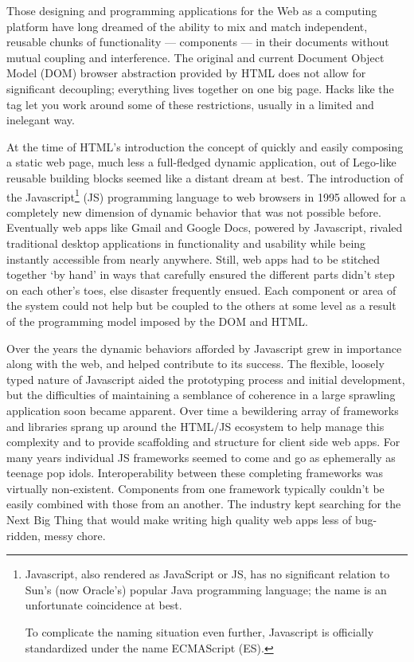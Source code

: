 Those designing and programming applications for the Web as a computing platform have long dreamed of the ability to mix and match independent, reusable chunks of functionality --- components --- in their documents without mutual coupling and interference. 
The original and current Document Object Model (DOM)
browser abstraction provided by HTML does not allow for significant decoupling; 
everything lives together on one big page. Hacks like the 
tag let you work around some of these restrictions, usually in a limited and inelegant way.

At the time of HTML's introduction the concept of quickly and easily composing a static web page, 
much less a full-fledged dynamic application, 
out of Lego-like reusable building blocks seemed like a distant dream at best. 
The introduction of the 
Javascript\footnote{Javascript, also rendered as JavaScript or JS, 
has no significant relation to Sun's (now Oracle's) popular Java programming language;
the name is an unfortunate coincidence at best.

To complicate the naming situation even further, Javascript is officially standardized under the name ECMAScript (ES).}
(JS) programming language to web browsers in 1995 allowed for a completely new dimension of dynamic behavior that was not possible before.
Eventually web apps like Gmail and Google Docs, powered by Javascript, rivaled traditional desktop applications in functionality and usability while being instantly accessible from nearly anywhere.
Still, web apps had to be stitched together `by hand' in ways that carefully ensured the different parts didn't step on each other's toes, else disaster frequently ensued. 
Each component or area of the system could not help but be coupled to the others at some level as a result of the programming model imposed by the DOM and HTML.

Over the years the dynamic behaviors afforded by Javascript grew in importance along with the web, and helped contribute to its success. 
The flexible, loosely typed nature of Javascript aided the prototyping process and initial development,
but the difficulties of maintaining a semblance of coherence in a large sprawling application soon became apparent.
Over time a bewildering array of frameworks and libraries sprang up around the HTML/JS ecosystem to help manage this complexity and to provide scaffolding and structure for client side web apps.
For many years individual JS frameworks seemed to come and go as ephemerally as teenage pop idols. 
Interoperability between these completing frameworks was virtually non-existent. 
Components from one framework typically couldn't be easily combined with those from an another.
The industry kept searching for the Next Big Thing that would make writing high quality web apps less of bug-ridden, messy chore. 

